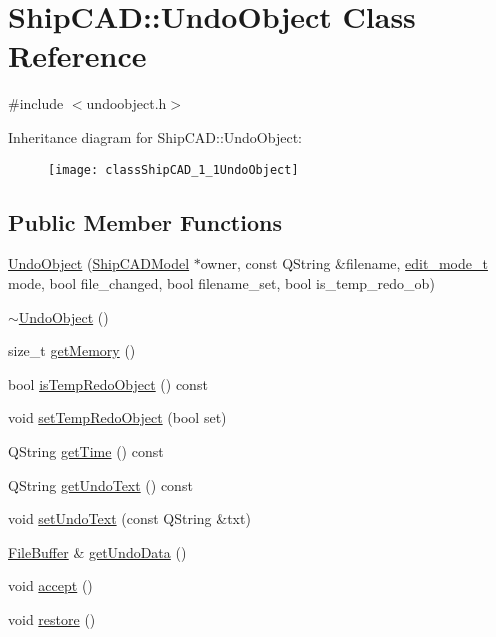 \hypertarget{classShipCAD_1_1UndoObject}{}\section{Ship\+C\+AD\+:\+:Undo\+Object Class Reference}
\label{classShipCAD_1_1UndoObject}


{\ttfamily \#include $<$undoobject.\+h$>$}

Inheritance diagram for Ship\+C\+AD\+:\+:Undo\+Object\+:\begin{figure}[H]
\begin{center}
\leavevmode
\texttt{[image: classShipCAD\_1\_1UndoObject]}
\end{center}
\end{figure}
\subsection*{Public Member Functions}
\begin{DoxyCompactItemize}
\item 
\hyperlink{classShipCAD_1_1UndoObject_a7822f20d55e4647ad4e4508b3e3f229b}{Undo\+Object} (\hyperlink{classShipCAD_1_1ShipCADModel}{Ship\+C\+A\+D\+Model} $\ast$owner, const Q\+String \&filename, \hyperlink{namespaceShipCAD_a66144e3f3a53da01f51c9bdb94fcae31}{edit\+\_\+mode\+\_\+t} mode, bool file\+\_\+changed, bool filename\+\_\+set, bool is\+\_\+temp\+\_\+redo\+\_\+ob)
\item 
\hyperlink{classShipCAD_1_1UndoObject_abfeebd1cd99df71bea798fafe15c474f}{$\sim$\+Undo\+Object} ()
\item 
size\+\_\+t \hyperlink{classShipCAD_1_1UndoObject_a74cc90d84599a153a37e13ab35018ff6}{get\+Memory} ()
\item 
bool \hyperlink{classShipCAD_1_1UndoObject_a52d77a41fe335cea77e9cd20af930de2}{is\+Temp\+Redo\+Object} () const 
\item 
void \hyperlink{classShipCAD_1_1UndoObject_aa4fdac113fedb0d552ac69e0e653fa6f}{set\+Temp\+Redo\+Object} (bool set)
\item 
Q\+String \hyperlink{classShipCAD_1_1UndoObject_afc8ab550246acb166070e0e2379cc19a}{get\+Time} () const 
\item 
Q\+String \hyperlink{classShipCAD_1_1UndoObject_a3007b17bbc46042a21baa0b895b8f751}{get\+Undo\+Text} () const 
\item 
void \hyperlink{classShipCAD_1_1UndoObject_aa6eac6ad9b80700ed37e354f970ff812}{set\+Undo\+Text} (const Q\+String \&txt)
\item 
\hyperlink{classShipCAD_1_1FileBuffer}{File\+Buffer} \& \hyperlink{classShipCAD_1_1UndoObject_a160e77df4c6ae2bdefc5257aa8e6d85b}{get\+Undo\+Data} ()
\item 
void \hyperlink{classShipCAD_1_1UndoObject_a93bad349f284a0ff1cece56aa931f9e3}{accept} ()
\item 
void \hyperlink{classShipCAD_1_1UndoObject_a9cace556c2092492f681654d72e35ba6}{restore} ()
\end{DoxyCompactItemize}


